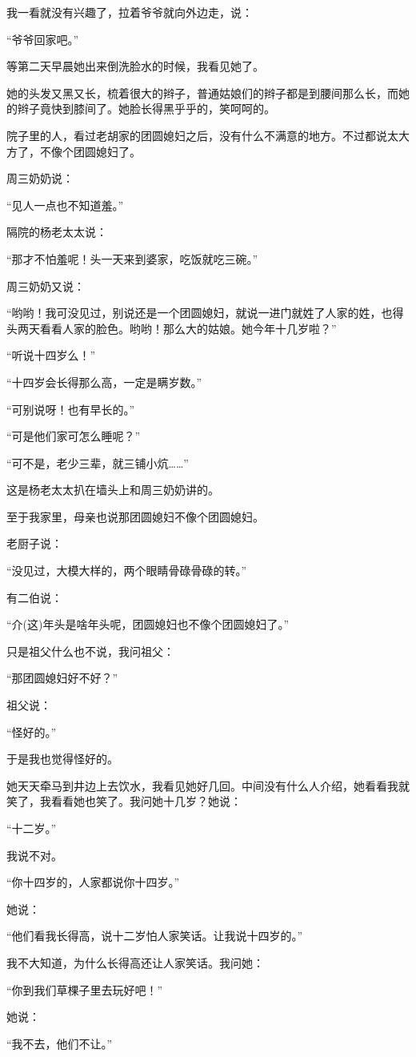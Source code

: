 \par 我一看就没有兴趣了，拉着爷爷就向外边走，说：
\par “爷爷回家吧。”
\par 等第二天早晨她出来倒洗脸水的时候，我看见她了。
\par 她的头发又黑又长，梳着很大的辫子，普通姑娘们的辫子都是到腰间那么长，而她的辫子竟快到膝间了。她脸长得黑乎乎的，笑呵呵的。
\par 院子里的人，看过老胡家的团圆媳妇之后，没有什么不满意的地方。不过都说太大方了，不像个团圆媳妇了。
\par 周三奶奶说：
\par “见人一点也不知道羞。”
\par 隔院的杨老太太说：
\par “那才不怕羞呢！头一天来到婆家，吃饭就吃三碗。”
\par 周三奶奶又说：
\par “哟哟！我可没见过，别说还是一个团圆媳妇，就说一进门就姓了人家的姓，也得头两天看看人家的脸色。哟哟！那么大的姑娘。她今年十几岁啦？”
\par “听说十四岁么！”
\par “十四岁会长得那么高，一定是瞒岁数。”
\par “可别说呀！也有早长的。”
\par “可是他们家可怎么睡呢？”
\par “可不是，老少三辈，就三铺小炕……”
\par 这是杨老太太扒在墙头上和周三奶奶讲的。
\par 至于我家里，母亲也说那团圆媳妇不像个团圆媳妇。
\par 老厨子说：
\par “没见过，大模大样的，两个眼睛骨碌骨碌的转。”
\par 有二伯说：
\par “介(这)年头是啥年头呢，团圆媳妇也不像个团圆媳妇了。”
\par 只是祖父什么也不说，我问祖父：
\par “那团圆媳妇好不好？”
\par 祖父说：
\par “怪好的。”
\par 于是我也觉得怪好的。
\par 她天天牵马到井边上去饮水，我看见她好几回。中间没有什么人介绍，她看看我就笑了，我看看她也笑了。我问她十几岁？她说：
\par “十二岁。”
\par 我说不对。
\par “你十四岁的，人家都说你十四岁。”
\par 她说：
\par “他们看我长得高，说十二岁怕人家笑话。让我说十四岁的。”
\par 我不大知道，为什么长得高还让人家笑话。我问她：
\par “你到我们草棵子里去玩好吧！”
\par 她说：
\par “我不去，他们不让。”
